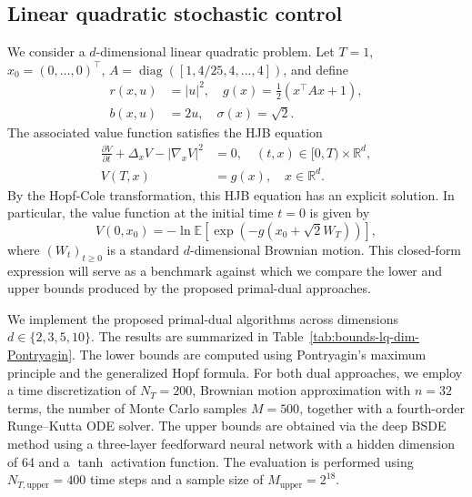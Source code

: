 \documentclass[11pt]{article}
\numberwithin{equation}{section}
\theoremstyle{plain}
\theoremstyle{definition}
\theoremstyle{remark}
\newcommand{\op}{\operatorname}
\newcommand{\R}{\mathbb{R}}
\newcommand{\bE}{\mathbb{E}}
\begin{document}
\subsection{Linear quadratic stochastic control}
We consider a $d$-dimensional linear quadratic problem. Let $T=1$, $x_0 = (0,\dots,0)^\top$, $A = \op{diag}([1, 4/25,4,\dots,4])$, and define 
\begin{equation*}
    \begin{aligned}
        r(x,u) &= |u|^2, \quad g(x) = \frac{1}{2}(x^\top A x + 1), \\
        b(x,u) &= 2u, \quad \sigma(x) = \sqrt{2}. 
    \end{aligned}
\end{equation*}
The associated value function satisfies the HJB equation 
\begin{equation*}
\begin{aligned}
    \frac{\partial V}{\partial t} + \Delta_x V - |\nabla_x V|^2 &= 0,\quad (t,x)\in [0,T)\times \R^d, \\
    V(T,x) &= g(x), \quad x\in \R^d.
\end{aligned}
\end{equation*}
By the Hopf-Cole transformation, this HJB equation has an explicit solution. In particular, the value function at the initial time $t=0$ is given by 
\begin{equation*}
    V(0, x_0) = -\ln \bE\left[ \exp\left( -g(x_0 + \sqrt{2}W_T) \right) \right],
\end{equation*}
where $(W_t)_{t\ge 0}$ is a standard $d$-dimensional Brownian motion. This closed-form expression will serve as a benchmark against which we compare the lower and upper bounds produced by the proposed primal-dual approaches. 

We implement the proposed primal-dual algorithms across dimensions $d\in \{2,3,5,10\}$. The results are summarized in Table~\ref{tab:bounds-lq-dim-Pontryagin}. The lower bounds are computed using Pontryagin's maximum principle and the generalized Hopf formula. For both dual approaches, we employ a time discretization of $N_T=200$, Brownian motion approximation with $n=32$ terms, the number of Monte Carlo samples $M=500$, together with a fourth-order Runge--Kutta ODE solver. The upper bounds are obtained via the deep BSDE method using a three-layer feedforward neural network with a hidden dimension of 64 and a $\tanh$ activation function. The evaluation is performed using $N_{T,\mathrm{upper}}=400$ time steps and a sample size of $M_{\mathrm{upper}}=2^{18}$.
\end{document}
